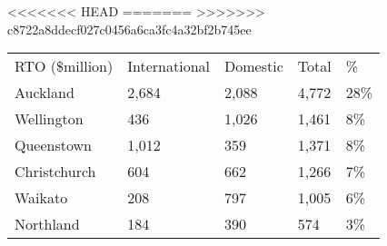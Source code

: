 <<<<<<< HEAD
=======
>>>>>>> c8722a8ddecf027c0456a6ca3fc4a32bf2b745ee
\begin{tabular}[t]{p{2cm}>{\hfill}p{1.5cm}>{\hfill}p{1cm}>{\hfill}p{0.9cm}>{\hfill}p{1.3cm}}
 RTO (\$million) & International & Domestic & Total & \% \\ 
 Auckland & 2,684 & 2,088 & 4,772 & 28\% \\ 
  Wellington &   436 & 1,026 & 1,461 & 8\% \\ 
  Queenstown & 1,012 &   359 & 1,371 & 8\% \\ 
  Christchurch &   604 &   662 & 1,266 & 7\% \\ 
  Waikato &   208 &   797 & 1,005 & 6\% \\ 
  Northland &   184 &   390 &   574 & 3\% \\ 
  \end{tabular}
